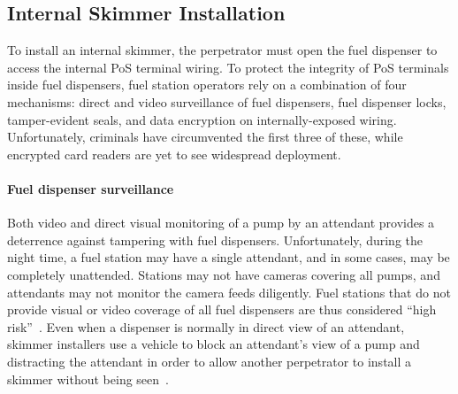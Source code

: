 


%


\subsection{Internal Skimmer Installation}
\label{sec:bkgd-install}

To install an internal skimmer, the perpetrator must open the fuel dispenser to access the internal PoS terminal wiring. To protect the integrity of PoS terminals inside fuel dispensers, fuel station operators rely on a combination of four mechanisms: direct and video surveillance of fuel dispensers, fuel dispenser locks, tamper-evident seals, and data encryption on internally-exposed wiring. Unfortunately, criminals have circumvented the first three of these, while encrypted card readers are yet to see widespread deployment.

\paragraph{Fuel dispenser surveillance} Both video and direct visual monitoring of a pump by an attendant provides a deterrence against tampering with fuel dispensers. Unfortunately, during the night time, a fuel station may have a single attendant, and in some cases, may be completely unattended. Stations may not have cameras covering all pumps, and attendants may not monitor the camera feeds diligently. Fuel stations that do not provide visual or video coverage of all fuel dispensers are thus considered ``high risk''~\cite{ny-fuel-paymentdoor-access}. Even when a dispenser is normally in direct view of an attendant, skimmer installers use a vehicle to block an attendant's view of a pump and distracting the attendant in order to allow another perpetrator to install a skimmer without being seen~\cite{skimmerinstall1,skimmerinstall2}.

